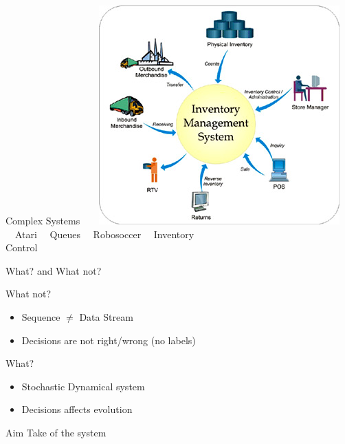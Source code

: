 \documentclass[10pt,handout]{beamer}
\begin{document}
\begin{frame}[fragile]{Complex Systems}
$\mbox{ }$$\mbox{ }$
\includegraphics[scale=0.125]{invent.jpeg}
$\mbox{ }$\\
$\mbox{ }$
\quad Atari\quad\quad\quad\quad
$\mbox{ }$
Queues\quad\quad\quad\quad
$\mbox{ }$
 Robosoccer\quad\quad
$\mbox{ }$
Inventory
$\mbox{ }$\\
\quad\quad\quad\quad\quad\quad\quad
\quad\quad\quad\quad\quad\quad\quad
\quad\quad\quad\quad\quad\quad\quad
\quad\quad\quad
Control

\end{frame}



\begin{frame}[fragile]{What? and What not?}

\begin{block}{What not?}
\begin{itemize}
\item Sequence $\neq$ Data Stream
\item Decisions are not right/wrong (no labels)
\end{itemize}
\end{block}

\begin{block}{What?}
\begin{itemize}
\item Stochastic Dynamical system
\item Decisions affects evolution
\end{itemize}

\end{block}
\begin{block}{Aim}
\centering Take {\color{orange}{control}} of the system
\end{block}
\end{frame}
\end{document}
